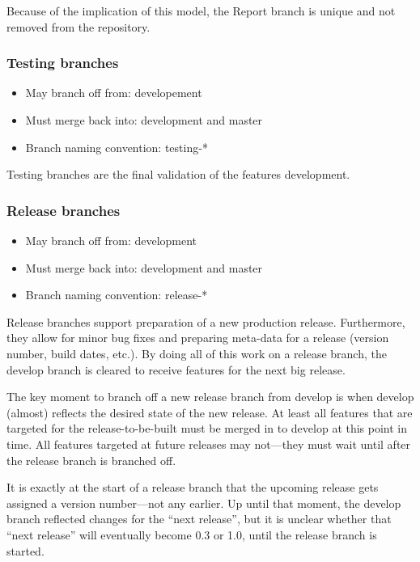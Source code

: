 Because of the implication of this model, the Report branch is unique and not
removed from the repository.

\subsubsection{Testing branches}
\begin{itemize}
  \item May branch off from: developement
  \item Must merge back into: development and master
  \item Branch naming convention: testing-*
\end{itemize}
Testing branches are the final validation of the features development.

\subsubsection{Release branches}
\begin{itemize}[itemsep=1pt, parsep=1pt]
  \item May branch off from: development
  \item Must merge back into: development and master
  \item Branch naming convention: release-* 
\end{itemize}

Release branches support preparation of a new production release. Furthermore,
they allow for minor bug fixes and preparing meta-data for a release (version
number, build dates, etc.). By doing all of this work on a release branch, the
develop branch is cleared to receive features for the next big release.

The key moment to branch off a new release branch from develop is when develop
(almost) reflects the desired state of the new release. At least all features
that are targeted for the release-to-be-built must be merged in to develop at
this point in time. All features targeted at future releases may not—they must
wait until after the release branch is branched off.

It is exactly at the start of a release branch that the upcoming release gets
assigned a version number—not any earlier. Up until that moment, the develop
branch reflected changes for the “next release”, but it is unclear whether that
“next release” will eventually become 0.3 or 1.0, until the release branch is
started.

